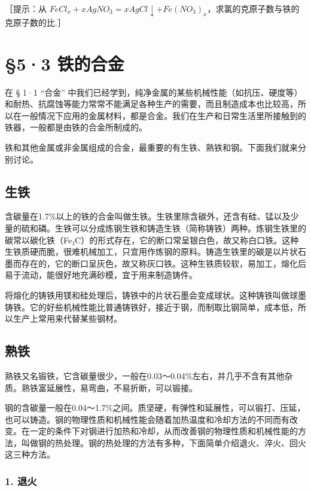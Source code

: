 ［提示：从
\(FeCl_{x}+xAgNO_{3}=xAgCl\downarrow+Fe(NO_{3})_{x}\)，求氯的克原子数与铁的克原子数的比.］

\section{§5·3 铁的合金}

在 § 1·1 ``合金''
中我们已经学到，纯净金属的某些机械性能（如抗压、硬度等）和耐热、抗腐蚀等能力常常不能满足各种生产的需要，而且制造成本也比较高，所以在一般情况下应用的金属材料，都是合金。我们在生产和日常生活里所接触到的铁器，一般都是由铁的合金所制成的。

铁和其他金属或非金属组成的合金，最重要的有生铁、熟铁和钢。下面我们就来分别讨论。

\subsection{生铁}

含碳量在1.7\%以上的铁的合金叫做生铁。生铁里除含碳外，还含有硅、锰以及少量的硫和磷。生铁可以分成炼钢生铁和铸造生铁（简称铸铁）两种。炼钢生铁里的碳常以碳化铁（Fe₃C）的形式存在，它的断口常呈银白色，故又称白口铁。这种生铁质硬而脆，很难机械加工，只宜用作炼钢的原料。铸造生铁里的碳是以片状石墨而存在的，它的断口呈灰色，故又称灰口铁。这种生铁质较软，易加工，熔化后易于流动，能很好地充满砂模，宜于用来制造铸件。

将熔化的铸铁用镁和硅处理后，铸铁中的片状石墨会变成球状。这种铸铁叫做球墨铸铁。它的好些机械性能比普通铸铁好，接近于钢，而制取比钢简单，成本低，所以生产上常用来代替某些钢材。

\subsection{熟铁}

熟铁又名锻铁，它含碳量很少，一般在0.03～0.04\%左右，并几乎不含有其他杂质。熟铁富延展性，易弯曲，不易折断，可以锻接。

钢的含碳量一般在0.04～1.7\%之间。质坚硬，有弹性和延展性，可以锻打、压延，也可以铸造。钢的物理性质和机械性能会随着加热温度和冷却方法的不同而有改变。在一定的条件下对钢进行加热和冷却，从而改善钢的物理性质和机械性能的方法，叫做钢的热处理。钢的热处理的方法有多种，下面简单介绍退火、淬火、回火这三种方法。

\subsubsection{1. 退火}

